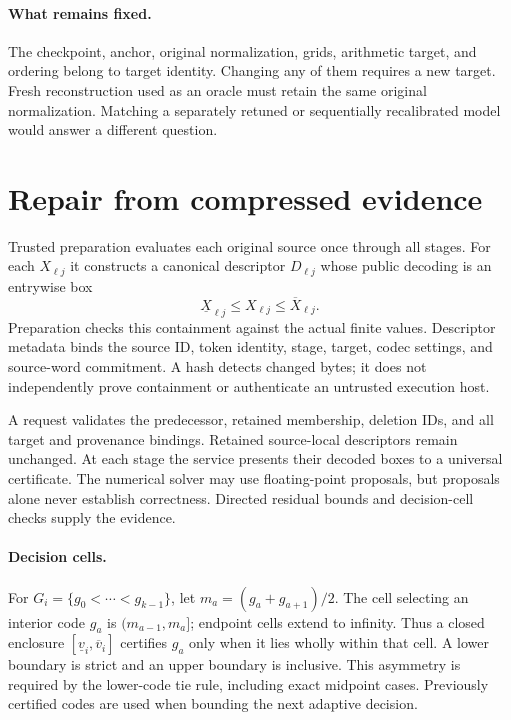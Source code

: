 \documentclass[10pt,twocolumn,letterpaper]{article}
\begin{document}
\paragraph{What remains fixed.}
The checkpoint, anchor, original normalization, grids, arithmetic target, and
ordering belong to target identity. Changing any of them requires a new target.
Fresh reconstruction used as an oracle must retain the same original
normalization. Matching a separately retuned or sequentially recalibrated model
would answer a different question.

\section{Repair from compressed evidence}
\label{sec:method}
Trusted preparation evaluates each original source once through all stages.
For each $X_{\ell j}$ it constructs a canonical descriptor $D_{\ell j}$ whose
public decoding is an entrywise box
\begin{equation}
 \underline X_{\ell j}\leq X_{\ell j}\leq\overline X_{\ell j}.
 \label{eq:containment}
\end{equation}
Preparation checks this containment against the actual finite values. Descriptor
metadata binds the source ID, token identity, stage, target, codec settings, and
source-word commitment. A hash detects changed bytes; it does not independently
prove containment or authenticate an untrusted execution host.

A request validates the predecessor, retained membership, deletion IDs, and all
target and provenance bindings. Retained source-local descriptors remain
unchanged. At each stage the service presents their decoded boxes to a universal
certificate. The numerical solver may use floating-point proposals, but proposals
alone never establish correctness. Directed residual bounds and decision-cell
checks supply the evidence.

\paragraph{Decision cells.}
For $G_i=\{g_0<\cdots<g_{k-1}\}$, let
$m_a=(g_a+g_{a+1})/2$. The cell selecting an interior code $g_a$ is
$(m_{a-1},m_a]$; endpoint cells extend to infinity. Thus a closed enclosure
$[\underline v_i,\overline v_i]$ certifies $g_a$ only when it lies wholly within
that cell. A lower boundary is strict and an upper boundary is inclusive. This
asymmetry is required by the lower-code tie rule, including exact midpoint cases.
Previously certified codes are used when bounding the next adaptive decision.
\end{document}
